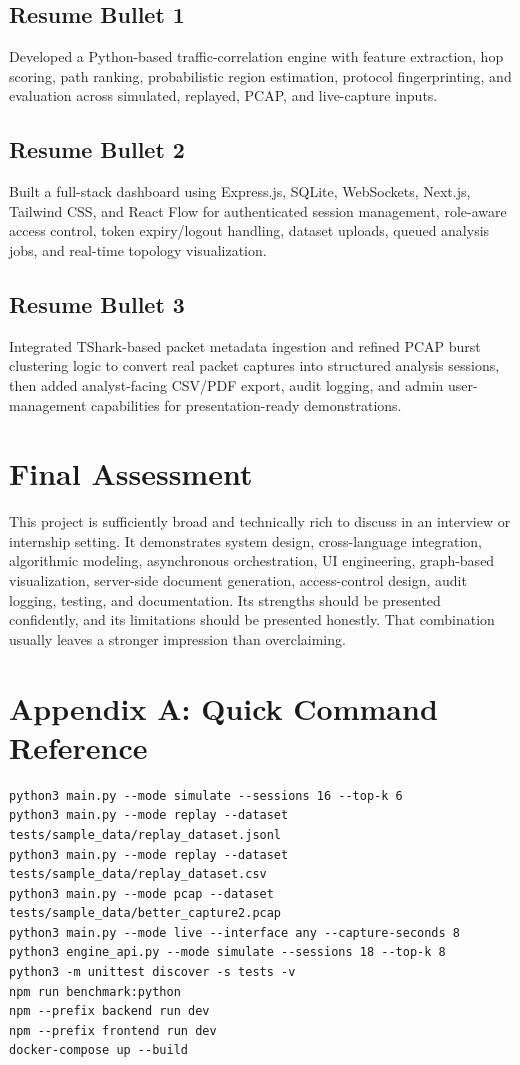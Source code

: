 \documentclass[12pt,a4paper]{report}
\begin{document}
\section{Resume Bullet 1}
Developed a Python-based traffic-correlation engine with feature extraction, hop scoring, path ranking, probabilistic region estimation, protocol fingerprinting, and evaluation across simulated, replayed, PCAP, and live-capture inputs.

\section{Resume Bullet 2}
Built a full-stack dashboard using Express.js, SQLite, WebSockets, Next.js, Tailwind CSS, and React Flow for authenticated session management, role-aware access control, token expiry/logout handling, dataset uploads, queued analysis jobs, and real-time topology visualization.

\section{Resume Bullet 3}
Integrated TShark-based packet metadata ingestion and refined PCAP burst clustering logic to convert real packet captures into structured analysis sessions, then added analyst-facing CSV/PDF export, audit logging, and admin user-management capabilities for presentation-ready demonstrations.

\chapter{Final Assessment}
This project is sufficiently broad and technically rich to discuss in an interview or internship setting. It demonstrates system design, cross-language integration, algorithmic modeling, asynchronous orchestration, UI engineering, graph-based visualization, server-side document generation, access-control design, audit logging, testing, and documentation. Its strengths should be presented confidently, and its limitations should be presented honestly. That combination usually leaves a stronger impression than overclaiming.

\chapter*{Appendix A: Quick Command Reference}
\begin{lstlisting}[style=codeblock]
python3 main.py --mode simulate --sessions 16 --top-k 6
python3 main.py --mode replay --dataset tests/sample_data/replay_dataset.jsonl
python3 main.py --mode replay --dataset tests/sample_data/replay_dataset.csv
python3 main.py --mode pcap --dataset tests/sample_data/better_capture2.pcap
python3 main.py --mode live --interface any --capture-seconds 8
python3 engine_api.py --mode simulate --sessions 18 --top-k 8
python3 -m unittest discover -s tests -v
npm run benchmark:python
npm --prefix backend run dev
npm --prefix frontend run dev
docker-compose up --build
\end{lstlisting}
\end{document}
